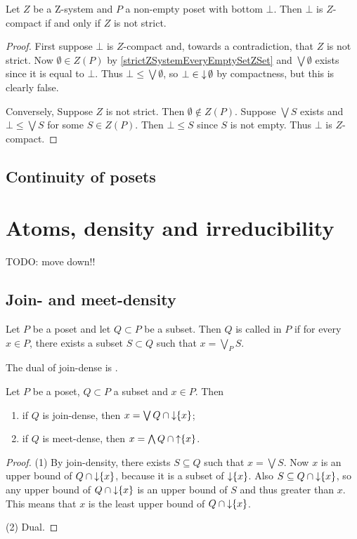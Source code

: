 \begin{lemma}
Let $Z$ be a $\mathrm{Z}$-system and $P$ a non-empty poset with bottom $\bot$. Then $\bot$ is $Z$-compact \textup{if and only if} $Z$ is not strict. 
\end{lemma}
\begin{proof}
First suppose $\bot$ is $Z$-compact and, towards a contradiction, that $Z$ is not strict. Now $\emptyset \in Z(P)$ by \ref{strictZSystemEveryEmptySetZSet} and $\bigvee \emptyset$ exists since it is equal to $\bot$. Thus $\bot \leq \bigvee \emptyset$, so $\bot \in \operatorname{\downarrow} \emptyset$ by compactness, but this is clearly false.

Conversely, Suppose $Z$ is not strict. Then $\emptyset\notin Z(P)$. Suppose $\bigvee S$ exists and $\bot \leq \bigvee S$ for some $S\in Z(P)$. Then $\bot \leq S$ since $S$ is not empty. Thus $\bot$ is $Z$-compact.
\end{proof}

\subsection{Continuity of posets}

\section{Atoms, density and irreducibility}
TODO: move down!!
\subsection{Join- and meet-density}
\begin{definition}
Let $P$ be a poset and let $Q\subset P$ be a subset. Then $Q$ is called  in $P$ if for every $x\in P$, there exists a subset $S\subset Q$ such that $x= \bigvee_P S$.

The dual of join-dense is .
\end{definition}

\begin{lemma}
Let $P$ be a poset, $Q\subset P$ a subset and $x\in P$. Then
\begin{enumerate}
\item if $Q$ is join-dense, then $x = \bigvee Q\cap \operatorname{\downarrow}\{x\}$;
\item if $Q$ is meet-dense, then $x = \bigwedge Q\cap \operatorname{\uparrow}\{x\}$.
\end{enumerate}
\end{lemma}
\begin{proof}
(1) By join-density, there exists $S\subseteq Q$ such that $x = \bigvee S$. Now $x$ is an upper bound of $Q\cap \operatorname{\downarrow}\{x\}$, because it is a subset of $\operatorname{\downarrow}\{x\}$. Also $S\subseteq Q\cap \operatorname{\downarrow}\{x\}$, so any upper bound of $Q\cap \operatorname{\downarrow}\{x\}$ is an upper bound of $S$ and thus greater than $x$. This means that $x$ is the least upper bound of $Q\cap \operatorname{\downarrow}\{x\}$.

(2) Dual.
\end{proof}

